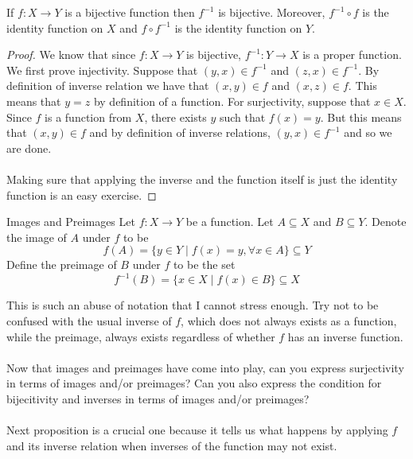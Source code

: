 \documentclass[a4paper]{article}
\begin{document}
\begin{prp}{}{} If $f:X\to Y$ is a bijective function then $f^{-1}$ is bijective. Moreover, $f^{-1}\circ f$ is the identity function on $X$ and $f\circ f^{-1}$ is the identity function on $Y$. \tcbline
\begin{proof}
We know that since $f:X\to Y$ is bijective, $f^{-1}:Y\to X$ is a proper function. We first prove injectivity. Suppose that $(y,x)\in f^{-1}$ and $(z,x)\in f^{-1}$. By definition of inverse relation we have that $(x,y)\in f$ and $(x,z)\in f$. This means that $y=z$ by definition of a function. For surjectivity, suppose that $x\in X$. Since $f$ is a function from $X$, there exists $y$ such that $f(x)=y$. But this means that $(x,y)\in f$ and by definition of inverse relations, $(y,x)\in f^{-1}$ and so we are done. \\~\\
Making sure that applying the inverse and the function itself is just the identity function is an easy exercise. 
\end{proof}
\end{prp}

\begin{defn}{Images and Preimages}{} Let $f:X\to Y$ be a function. Let $A\subseteq X$ and $B\subseteq Y$. Denote the image of $A$ under $f$ to be $$f(A)=\{y\in Y\;|\;f(x)=y,\forall x\in A\}\subseteq Y$$
Define the preimage of $B$ under $f$ to be the set $$f^{-1}(B)=\{x\in X\;|\;f(x)\in B\}\subseteq X$$
\end{defn}

This is such an abuse of notation that I cannot stress enough. Try not to be confused with the usual inverse of $f$, which does not always exists as a function, while the preimage, always exists regardless of whether $f$ has an inverse function. \\~\\

Now that images and preimages have come into play, can you express surjectivity in terms of images and/or preimages? Can you also express the condition for bijecitivity and inverses in terms of images and/or preimages? \\~\\

Next proposition is a crucial one because it tells us what happens by applying $f$ and its inverse relation when inverses of the function may not exist. 
\end{document}
